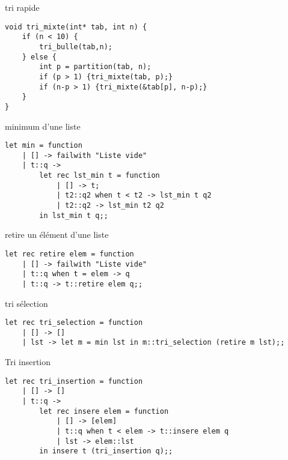 \begin{imp*}{tri rapide}
\begin{verbatim}
void tri_mixte(int* tab, int n) {
    if (n < 10) {
        tri_bulle(tab,n);
    } else {
        int p = partition(tab, n);
        if (p > 1) {tri_mixte(tab, p);}
        if (n-p > 1) {tri_mixte(&tab[p], n-p);}
    }
}
\end{verbatim}
\end{imp*}
\ocaml
\begin{imp*}{minimum d'une liste}
\begin{verbatim}
let min = function
    | [] -> failwith "Liste vide"
    | t::q ->
        let rec lst_min t = function
            | [] -> t;
            | t2::q2 when t < t2 -> lst_min t q2
            | t2::q2 -> lst_min t2 q2
        in lst_min t q;;
\end{verbatim}
\end{imp*}
\begin{imp*}{retire un élément d'une liste}
\begin{verbatim}
let rec retire elem = function
    | [] -> failwith "Liste vide"
    | t::q when t = elem -> q
    | t::q -> t::retire elem q;;
\end{verbatim}
\end{imp*}
\begin{imp*}{tri sélection}
\begin{verbatim}
let rec tri_selection = function
    | [] -> []
    | lst -> let m = min lst in m::tri_selection (retire m lst);;
\end{verbatim}
\end{imp*}
\begin{imp*}{Tri insertion}
\begin{verbatim}
let rec tri_insertion = function
    | [] -> []
    | t::q ->
        let rec insere elem = function
            | [] -> [elem]
            | t::q when t < elem -> t::insere elem q
            | lst -> elem::lst
        in insere t (tri_insertion q);;
\end{verbatim}
\end{imp*}
